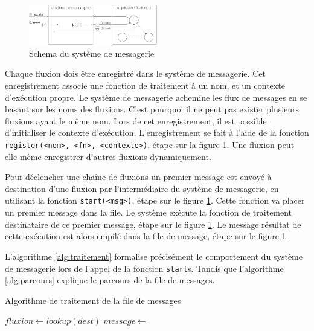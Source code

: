 \begin{figure}[h!]
  \includegraphics[width=0.5\textwidth]{schema-message.pdf}
  \caption{Schema du système de messagerie}
  \label{fig:messagerie}
\end{figure}

Chaque fluxion dois être enregistré dans le système de messagerie.
Cet enregistrement associe une fonction de traitement à un nom, et un contexte d'exécution propre.
Le système de messagerie achemine les flux de messages en se basant sur les noms des fluxions.
C'est pourquoi il ne peut pas exister plusieurs fluxions ayant le même nom.
Lors de cet enregistrement, il est possible d'initialiser le contexte d'exécution.
L'enregistrement se fait à l'aide de la fonction \texttt{register(<nom>, <fn>, <contexte>)}, étape  sur la figure \ref{fig:messagerie}.
Une fluxion peut elle-même enregistrer d'autres fluxions dynamiquement.

Pour déclencher une chaîne de fluxions un premier message est envoyé à destination d'une fluxion par l'intermédiaire du système de messagerie, en utilisant la fonction \texttt{start(<msg>)}, étape  sur le figure \ref{fig:messagerie}.
Cette fonction va placer un premier message dans la file.
Le système exécute la fonction de traitement destinataire de ce premier message, étape  sur le figure \ref{fig:messagerie}.
Le message résultat de cette exécution est alors empilé dans la file de message, étape  sur le figure \ref{fig:messagerie}.

L'algorithme \ref{alg:traitement} formalise précisément le comportement du système de messagerie lors de l'appel de la fonction \texttt{start}s.
Tandis que l'algorithme \ref{alg:parcours} explique le parcours de la file de messages.

\begin{algorithm}
\caption{Algorithme de traitement de la file de messages}
\label{alg:traitement}
\begin{algorithmic}
\State $fluxion \gets lookup(dest)$
\State $message \gets$  
\State {} 
\EndFor
\EndFunction
\end{algorithmic}
\end{algorithm}


